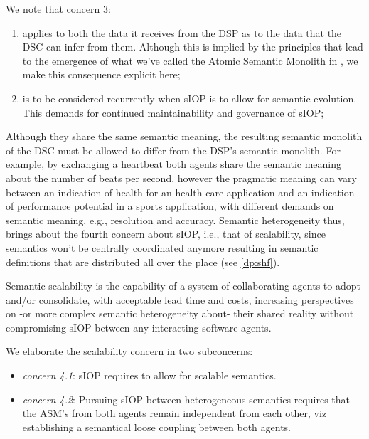 \documentclass[sort&compress,preprint,authoryear,3p,twocolumn]{elsarticle}
\providecommand{\tightlist}{%
  \setlength{\itemsep}{0pt}\setlength{\parskip}{0pt}}
\begin{document}
We note that concern 3:

\begin{enumerate}
\def\labelenumi{\arabic{enumi}.}
\tightlist
\item
  applies to both the data it receives from the DSP as to the data that
  the DSC can infer from them. Although this is implied by the
  principles that lead to the emergence of what we've called the Atomic
  Semantic Monolith in \citep{Brandt2021a}, we make this consequence
  explicit here;
\item
  is to be considered recurrently when sIOP is to allow for semantic
  evolution. This demands for continued maintainability and governance
  of sIOP;
\end{enumerate}

Although they share the same semantic meaning, the resulting semantic
monolith of the DSC must be allowed to differ from the DSP's semantic
monolith. For example, by exchanging a heartbeat both agents share the
semantic meaning about the number of beats per second, however the
pragmatic meaning can vary between an indication of health for an
health-care application and an indication of performance potential in a
sports application, with different demands on semantic meaning, e.g.,
resolution and accuracy. Semantic heterogeneity thus, brings about the
fourth concern about sIOP, i.e., that of scalability, since semantics
won't be centrally coordinated anymore resulting in semantic definitions
that are distributed all over the place (see \cref{dp:shf}).

\begin{mmdef}\label{def:semantic-scalability}
Semantic scalability is the capability of a system of collaborating agents to adopt and/or consolidate, with acceptable lead time and costs, increasing perspectives on -or more complex semantic heterogeneity about- their shared reality without compromising sIOP between any interacting software agents. 
\end{mmdef}

We elaborate the scalability concern in two subconcerns:

\begin{itemize}
\tightlist
\item
  \emph{concern 4.1}: sIOP requires to allow for scalable semantics.
\item
  \emph{concern 4.2}: Pursuing sIOP between heterogeneous semantics
  requires that the ASM's from both agents remain independent from each
  other, viz establishing a semantical loose coupling between both
  agents.
\end{itemize}
\end{document}
